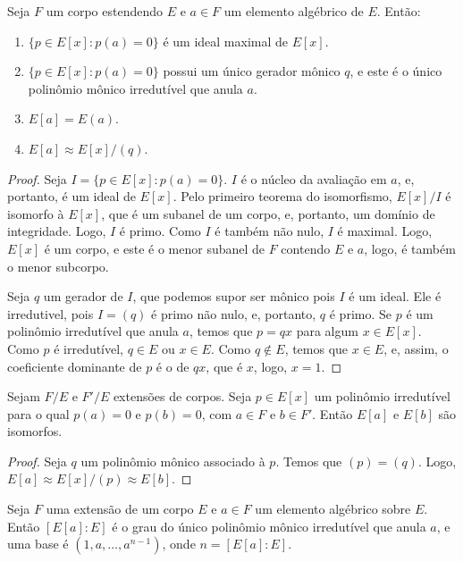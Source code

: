\begin{prop}
    Seja $F$ um corpo estendendo $E$ e $a\in F$ um elemento algébrico de $E$. Então:
    \begin{enumerate}
        \item $\{p \in E[x]: p(a)=0\}$ é um ideal maximal de $E[x]$.
        \item $\{p \in E[x]: p(a)=0\}$ possui um único gerador mônico $q$, e este é o único polinômio mônico irredutível que anula $a$.
        \item $E[a]=E(a)$.
        \item $E[a]\approx E[x]/(q)$.
    \end{enumerate}
\end{prop}
\begin{proof}
    Seja $I=\{p \in E[x]: p(a)=0\}$. $I$ é o núcleo da avaliação em $a$, e, portanto, é um ideal de $E[x]$.
    Pelo primeiro teorema do isomorfismo, $E[x]/I$ é isomorfo à $E[x]$, que é um subanel de um corpo, e, portanto, um domínio de integridade. Logo, $I$ é primo.
    Como $I$ é também não nulo, $I$ é maximal.
    Logo, $E[x]$ é um corpo, e este é o menor subanel de $F$ contendo $E$ e $a$, logo, é também o menor subcorpo.

    Seja $q$ um gerador de $I$, que podemos supor ser mônico pois $I$ é um ideal.
    Ele é irredutivel, pois $I=(q)$ é primo não nulo, e, portanto, $q$ é primo.
    Se $p$ é um polinômio irredutível que anula $a$, temos que $p=qx$ para algum $x \in E[x]$. Como $p$ é irredutível, $q \in E$ ou $x \in E$. Como $q \notin E$, temos que $x \in E$, e, assim, o coeficiente dominante de $p$ é o de $qx$, que é $x$, logo, $x=1$.
\end{proof}
\begin{corol}
    Sejam $F/E$ e $F'/E$ extensões de corpos. Seja $p\in E[x]$ um polinômio irredutível para o qual $p(a)=0$ e $p(b)=0$, com $a \in F$ e $b \in F'$.
    Então $E[a]$ e $E[b]$ são isomorfos.
\end{corol}
\begin{proof}
    Seja $q$ um polinômio mônico associado à $p$. Temos que $(p)=(q)$. Logo, $E[a]\approx E[x]/(p)\approx E[b]$.
\end{proof}
\begin{prop}
    Seja $F$ uma extensão de um corpo $E$ e $a \in F$ um elemento algébrico sobre $E$. Então $[E[a]:E]$ é o grau do único polinômio mônico irredutível que anula $a$, e uma base é $(1, a, \dots, a^{n-1})$, onde $n=[E[a]:E]$.
\end{prop}
